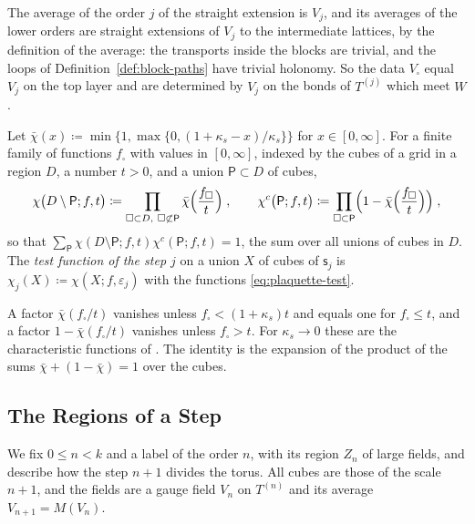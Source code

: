 \documentclass[11pt]{preprint}
\numberwithin{equation}{section}
\begin{document}
The average of the order $j$ of the straight extension is $V_j$, and its averages of the lower orders are straight extensions of $V_j$ to the intermediate lattices, by the definition of the average: the transports inside the blocks are trivial, and the loops of Definition~\ref{def:block-paths} have trivial holonomy. So the data $V_\square$ equal $V_j$ on the top layer and are determined by $V_j$ on the bonds of $T^{(j)}$ which meet $W$.

\begin{definition}\label{def:soft-test}
Let $\bar\chi(x) \coloneqq \min\{ 1, \max\{ 0, (1 + \kappa_s - x)/\kappa_s \} \}$ for $x \in [0, \infty]$. For a finite family of functions $f_\square$ with values in $[0, \infty]$, indexed by the cubes of a grid in a region $D$, a number $t > 0$, and a union $\mathsf P \subset D$ of cubes,
\begin{equation}\label{eq:soft-term}
    \chi\bigl(D \setminus \mathsf P; f, t\bigr) \coloneqq \prod_{\square \subset D,\ \square \not\subset \mathsf P}\bar\chi\Bigl(\frac{f_\square}{t}\Bigr)\;,
    \qquad
    \chi^c\bigl(\mathsf P; f, t\bigr) \coloneqq \prod_{\square \subset \mathsf P}\Bigl(1 - \bar\chi\Bigl(\frac{f_\square}{t}\Bigr)\Bigr)\;,
\end{equation}
so that $\sum_{\mathsf P}\chi(D \setminus \mathsf P; f, t)\chi^c(\mathsf P; f, t) = 1$, the sum over all unions of cubes in $D$. The \emph{test function of the step $j$} on a union $X$ of cubes of $\mathsf s_j$ is $\chi_j(X) \coloneqq \chi(X; f, \varepsilon_j)$ with the functions \eqref{eq:plaquette-test}.
\end{definition}

A factor $\bar\chi(f_\square/t)$ vanishes unless $f_\square < (1 + \kappa_s)t$ and equals one for $f_\square \leqslant t$, and a factor $1 - \bar\chi(f_\square/t)$ vanishes unless $f_\square > t$. For $\kappa_s \to 0$ these are the characteristic functions of \cite[(2.17), (3.2)]{BalabanCRE}. The identity is the expansion of the product of the sums $\bar\chi + (1 - \bar\chi) = 1$ over the cubes.

\subsection{The Regions of a Step}\label{sec:step-regions}

We fix $0 \leqslant n < k$ and a label of the order $n$, with its region $Z_n$ of large fields, and describe how the step $n + 1$ divides the torus. All cubes are those of the scale $n + 1$, and the fields are a gauge field $V_n$ on $T^{(n)}$ and its average $V_{n+1} = M(V_n)$.
\end{document}
